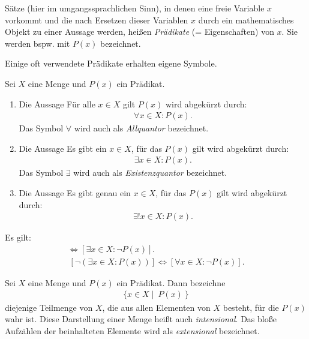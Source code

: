 \begin{mydef}
    Sätze (hier im umgangssprachlichen Sinn), in denen eine freie Variable $x$ vorkommt und die nach Ersetzen dieser Variablen $x$ durch ein mathematisches Objekt zu einer Aussage werden, 
    heißen \textit{Prädikate} (= Eigenschaften) von $x$. Sie werden bspw. mit $P(x)$ bezeichnet.
\end{mydef}

Einige oft verwendete Prädikate erhalten eigene Symbole. 

\begin{mydef}
    Sei $X$ eine Menge und $P(x)$ ein Prädikat.
    \begin{enumerate}
        \item 
        Die Aussage \glqq Für alle $x \in X$ gilt $P(x)$ \grqq  wird abgekürzt durch: 
        \begin{align*}
            \forall x \in X : P(x).
        \end{align*}
        Das Symbol $\forall$ wird auch als \textit{Allquantor} bezeichnet. 
        \item 
        Die Aussage \glqq Es gibt ein $x \in X$, für das $P(x)$ gilt \grqq  wird abgekürzt durch: 
        \begin{align*}
            \exists x \in X : P(x).
        \end{align*}
        Das Symbol $\exists$ wird auch als \textit{Existenzquantor} bezeichnet. 
        \item 
        Die Aussage \glqq Es gibt genau ein $x \in X$, für das $P(x)$ gilt \grqq wird abgekürzt durch:
        \begin{align*}
            \exists ! x \in X : P(x). 
        \end{align*}
    \end{enumerate}
\end{mydef}

\begin{remark}
    Es gilt: 
    \begin{align*}
        [ \neg (\forall x \in X: P(x))] \iff [\exists x \in X: \neg P(x)]. \\\
        [ \neg (\exists x \in X: P(x))] \iff [\forall x \in X: \neg P(x)].
    \end{align*}
\end{remark}

\begin{mydef}
    Sei $X$ eine Menge und $P(x)$ ein Prädikat. Dann bezeichne 
    \begin{align*}
        \{ x \in X \mid \ P(x) \ \}
    \end{align*}
    diejenige Teilmenge von $X$, die aus allen Elementen von $X$ besteht, für die $P(x)$ wahr ist. Diese Darstellung einer Menge heißt auch \textit{intensional}. 
    Das bloße Aufzählen der beinhalteten Elemente wird als \textit{extensional} bezeichnet. 
\end{mydef}

